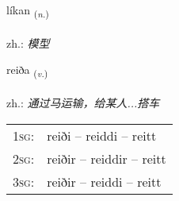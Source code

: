 \documentclass[frontgrid, backgrid]{flacards}\usepackage[]{graphicx}\usepackage[]{xcolor}
\begin{document}
\renewcommand{\flhead}{\vskip5pt \fboxsep=0pt {\small\bfseries\footnotesize Nafnorð | 名词}}
\renewcommand{\fcfoot}{\vskip5pt \fboxsep=0pt \hspace{2pt}{\small\bfseries\footnotesize 3K}}

\renewcommand{\blhead}{\vskip5pt {\small\bfseries\footnotesize Nafnorð | 名词 }}
\renewcommand{\bcfoot}{\vskip5pt \hspace{2pt}{\small\bfseries\footnotesize 3K}}


{líkan \small{\textsubscript{(\textit{n.})}} \\[1ex] %
\textphonetic{[liːkan]} \\
zh.: \emph{模型} \\  [2ex]
\renewcommand*{\arraystretch}{0.8}
}

\renewcommand{\flhead}{\vskip5pt \fboxsep=0pt {\small\bfseries\footnotesize Sagnorð | 动词}}
\renewcommand{\fcfoot}{\vskip5pt \fboxsep=0pt \hspace{2pt}{\small\bfseries\footnotesize 3K}}

\renewcommand{\blhead}{\vskip5pt {\small\bfseries\footnotesize Sagnorð | 动词 }}
\renewcommand{\bcfoot}{\vskip5pt \hspace{2pt}{\small\bfseries\footnotesize 3K}}


{reiða \small{\textsubscript{(\textit{v.})}} \\[1ex] %
\textphonetic{[reiːða]} \\
zh.: \emph{通过马运输，给某人...搭车} \\  [2ex]
\renewcommand*{\arraystretch}{0.8}
\begin{tabular}{p{1cm}l}
\textsc{1sg}: & reiði -- reiddi -- reitt \\ 
\textsc{2sg}: & reiðir -- reiddir -- reitt \\ 
\textsc{3sg}: & reiðir -- reiddi -- reitt \\ 
\end{tabular}
}
\end{document}
